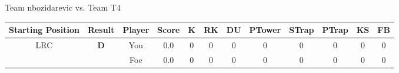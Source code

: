 \documentclass[a4paper,12pt]{article}
\begin{document}
\begin{tabular}[t]{| c | c | c | c | c | c | c | c | c | c | c | c
      |}
                      
      
                      
      
                      
      
                      
      
                      
      
                      
      
                      
                        \hline
                      \end{tabular}
                      
  \vspace*{2em}
  \par {\large {\color{Gray} Team} nbozidarevic {\color{Gray}
      vs. Team} T4}
  \newline
  \begin{tabular}[t]{| c | c | c | c | c | c | c | c | c | c | c | c
      |}
    \hline
    Starting Position & \textbf{Result} & Player & \textbf{Score} & K & RK & DU & PTower & STrap & PTrap & KS & FB \\
    
      
                      
      
                      
      
                      
      
                      
      
                      
      
        \hline
        \multirow{2}{*}{  LRC
             } &
              \multirow{2}{*}{  
                  \textbf{D}  } & 
                    \cellcolor{yellow!25} You & \cellcolor{yellow!25} 0.0 & \cellcolor{yellow!25} 0 &
                    \cellcolor{yellow!25} 0 & \cellcolor{yellow!25} 0 & \cellcolor{yellow!25} 0 &
                    \cellcolor{yellow!25} 0 & \cellcolor{yellow!25} 0 & \cellcolor{yellow!25} 0 &
                    \cellcolor{yellow!25} 0 \\
                    \cline{3-12}
                    & & \cellcolor{red!15} Foe & \cellcolor{red!15} 0.0 & \cellcolor{red!15} 0 & \cellcolor{red!15}
                    0 & \cellcolor{red!15} 0
                    & \cellcolor{red!15} 0 & \cellcolor{red!15}
                    0 & \cellcolor{red!15} 0 
                    & \cellcolor{red!15} 0 & \cellcolor{red!15}
                    0 \\
                    
                      
      

\end{tabular}
\end{document}
